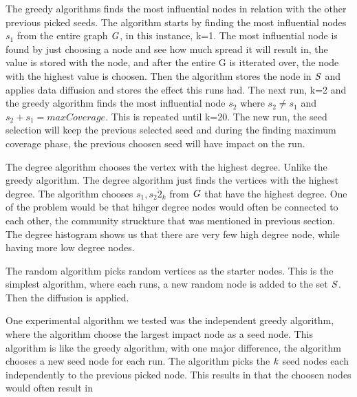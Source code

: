 The greedy algorithms finds the most influential nodes in relation with the other previous picked seeds. The algorithm starts by finding the most influential nodes $s_1$ from the entire graph $\it{G}$, in this instance, k=1. The most influential node is found by just choosing a node and see how much spread it will result in, the value is stored with the node, and after the entire G is itterated over, the node with the highest value is choosen. Then the algorithm stores the node in $\it{S}$ and applies data diffusion and stores the effect this runs had. The next run, k=2 and the greedy algorithm finds the most influential node $s_2$ where $s_2 \neq s_1$ and $s_2 +s_1 = maxCoverage$. This is repeated until k=20. The new run, the seed selection will keep the previous selected seed and during the finding maximum coverage phase, the previous choosen seed will have impact on the run.

The degree algorithm chooses the vertex with the highest degree. Unlike the greedy algorithm. The degree algorithm just finds the vertices with the highest degree. The algorithm chooses $s_1, s_2 \dot 2_k$ from $\it{G}$ that have the highest degree. One of the problem would be that hihger degree nodes would often be connected to each other, the community struckture that was mentioned in previous section. The degree histogram shows us that there are very few high degree node, while having more low degree nodes.

The random algorithm picks random vertices as the starter nodes. This is the simplest algorithm, where each runs, a new random node is added to the set $\it{S}$. Then the diffusion is applied. 

One experimental algorithm we tested was the independent greedy algorithm, where the algorithm choose the largest impact node as a seed node. This algorithm is like the greedy algorithm, with one major difference, the algorithm chooses a new seed node for each run. The algorithm picks the $\it{k}$ seed nodes each independently to the previous picked node. This results in that the choosen nodes would often result in  
